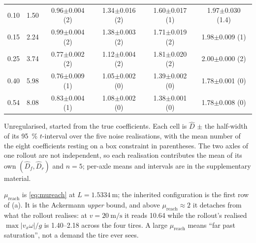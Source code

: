 \begin{table}[t]
\begin{threeparttable}
\begin{tabular}{@{}rrcccc@{}}
0.10 & 1.50 & \num{0.96}$\pm$\num{0.004} (2) & \num{1.34}$\pm$\num{0.016} (2) & \num{1.60}$\pm$\num{0.017} (1) & \num{1.97}$\pm$\num{0.030} (1.4)\\
0.15 & 2.24 & \num{0.99}$\pm$\num{0.004} (2) & \num{1.38}$\pm$\num{0.003} (2) & \num{1.71}$\pm$\num{0.019} (2) & \num{1.98}$\pm$\num{0.009} (1)\\
0.25 & 3.74 & \num{0.77}$\pm$\num{0.002} (2) & \num{1.12}$\pm$\num{0.004} (2) & \num{1.81}$\pm$\num{0.020} (2) & \num{2.00}$\pm$\num{0.000} (2)\\
0.40 & 5.98 & \num{0.76}$\pm$\num{0.009} (1) & \num{1.05}$\pm$\num{0.002} (0) & \num{1.39}$\pm$\num{0.002} (0) & \num{1.78}$\pm$\num{0.001} (0)\\
0.54 & 8.08 & \num{0.83}$\pm$\num{0.004} (1) & \num{1.08}$\pm$\num{0.002} (0) & \num{1.38}$\pm$\num{0.001} (0) & \num{1.78}$\pm$\num{0.008} (0)\\
\bottomrule
\end{tabular}
\begin{tablenotes}[flushleft]\scriptsize
\item Unregularised, started from the true coefficients. Each cell is $\hat D$ $\pm$ the half-width of its \SI{95}{\percent} $t$-interval over the five noise realisations, with the mean number of the eight coefficients resting on a box constraint in parentheses. The two axles of one rollout are not independent, so each realisation contributes the mean of its own $(\hat D_{f},\hat D_{r})$ and $n=5$; per-axle means and intervals are in the supplementary material.
\item $\mu_{\mathrm{reach}}$ is \eqref{eq:mureach} at $L=\SI{1.5334}{\meter}$; the inherited configuration is the first row of (a). It is the Ackermann \emph{upper} bound, and above $\mu_{\mathrm{reach}}\approx2$ it detaches from what the rollout realises: at $v=\SI{20}{\meter\per\second}$ it reads \num{10.64} while the rollout's realised $\max|v_{x}\omega|/g$ is \numrange{1.40}{2.18} across the four tires. A large $\mu_{\mathrm{reach}}$ means ``far past saturation'', not a demand the tire ever sees.
\end{tablenotes}
\end{threeparttable}
\end{table}


